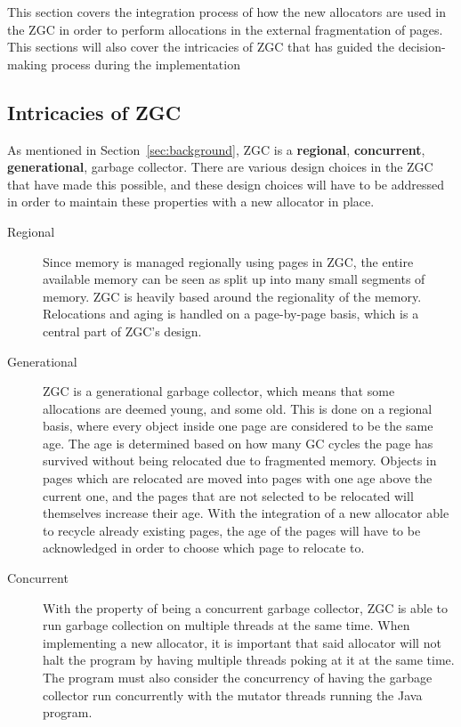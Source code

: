 
This section covers the integration process of how the new allocators are used in the ZGC in order to perform allocations in the external fragmentation of pages. This sections will also cover the intricacies of ZGC that has guided the decision-making process during the implementation

\subsection{Intricacies of ZGC}
As mentioned in Section~\ref*{sec:background}, ZGC is a \textbf{regional}, \textbf{concurrent}, \textbf{generational}, garbage collector. There are various design choices in the ZGC that have made this possible, and these design choices will have to be addressed in order to maintain these properties with a new allocator in place. 
\begin{description}
    \item[Regional] Since memory is managed regionally using pages in ZGC, the entire available memory can be seen as split up into many small segments of memory. ZGC is heavily based around the regionality of the memory. Relocations and aging is handled on a page-by-page basis, which is a central part of ZGC's design.
    \item[Generational] ZGC is a generational garbage collector, which means that some allocations are deemed young, and some old. This is done on a regional basis, where every object inside one page are considered to be the same age. The age is determined based on how many GC cycles the page has survived without being relocated due to fragmented memory. Objects in pages which are relocated are moved into pages with one age above the current one, and the pages that are not selected to be relocated will themselves increase their age. With the integration of a new allocator able to recycle already existing pages, the age of the pages will have to be acknowledged in order to choose which page to relocate to.
    \item[Concurrent] With the property of being a concurrent garbage collector, ZGC is able to run garbage collection on multiple threads at the same time. When implementing a new allocator, it is important that said allocator will not halt the program by having multiple threads poking at it at the same time. The program must also consider the concurrency of having the garbage collector run concurrently with the mutator threads running the Java program.
\end{description}

